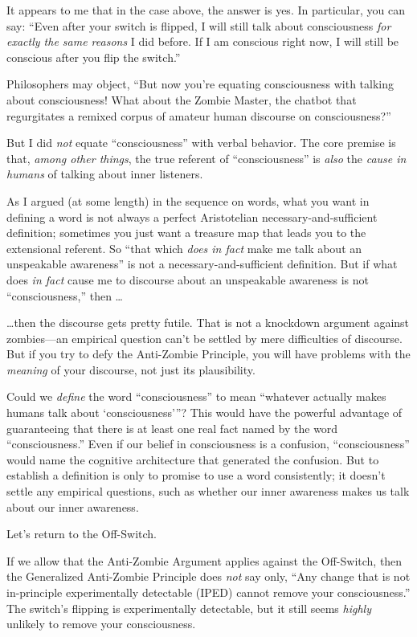{
 It appears to me that in the case above, the answer is yes. In
particular, you can say: ``Even after your switch is
flipped, I will still talk about consciousness \textit{for exactly the
same reasons} I did before. If I am conscious right now, I will still
be conscious after you flip the switch.''}

{
 Philosophers may object, ``But now
you're equating consciousness with talking about
consciousness! What about the Zombie Master, the chatbot that
regurgitates a remixed corpus of amateur human discourse on
consciousness?''}

{
 But I did \textit{not} equate
``consciousness'' with verbal
behavior. The core premise is that, \textit{among other things}, the
true referent of ``consciousness''
is \textit{also} the \textit{cause in humans} of talking about inner
listeners.}

{
 As I argued (at some length) in the sequence on words, what you
want in defining a word is not always a perfect Aristotelian
necessary-and-sufficient definition; sometimes you just want a treasure
map that leads you to the extensional referent. So
``that which \textit{does in fact} make me talk about
an unspeakable awareness'' is not a
necessary-and-sufficient definition. But if what does \textit{in fact}
cause me to discourse about an unspeakable awareness is not
``consciousness,'' then \ldots}

{
 \ldots then the discourse gets pretty futile. That is not a
knockdown argument against zombies---an empirical question
can't be settled by mere difficulties of discourse. But
if you try to defy the Anti-Zombie Principle, you will have problems
with the \textit{meaning} of your discourse, not just its
plausibility.}

{
 Could we \textit{define} the word
``consciousness'' to mean
``whatever actually makes humans talk about
`consciousness'''?
This would have the powerful advantage of guaranteeing that there is at
least one real fact named by the word
``consciousness.'' Even if our
belief in consciousness is a confusion,
``consciousness'' would name the
cognitive architecture that generated the confusion. But to establish a
definition is only to promise to use a word consistently; it
doesn't settle any empirical questions, such as whether
our inner awareness makes us talk about our inner awareness.}

{
 Let's return to the Off-Switch.}

{
 If we allow that the Anti-Zombie Argument applies against the
Off-Switch, then the Generalized Anti-Zombie Principle does
\textit{not} say only, ``Any change that is not
in-principle experimentally detectable (IPED) cannot remove your
consciousness.'' The switch's
flipping is experimentally detectable, but it still seems
\textit{highly} unlikely to remove your consciousness.}


